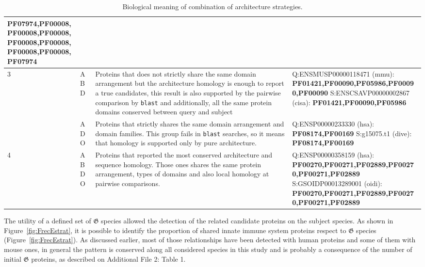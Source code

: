 \documentclass[11pt]{article}
\begin{document}
\begin{table}
\begin{center}
\begin{tabular}{p{1cm}p{1.2cm}p{9cm}p{10cm}}
{PF07974,PF00008,PF00008,PF00008,PF00008,PF00008,PF00008,PF00008,PF07974} \\
\midrule
3 & ABD & Proteins that does not strictly share the same domain arrangement
but the architecture homology is enough to report a true candidates, this 
result is also supported by the pairwise comparison by \texttt{blast} and 
additionally, all the same protein domains conserved between query and subject & 
Q:ENSMUSP00000118471 (mmu): \textbf{PF01421,PF00090,PF05986,PF00090,PF00090}
S:ENSCSAVP00000002867 (cisa): \textbf{PF01421,PF00090,PF05986}\\
& ADO & Proteins that strictly shares the same domain arrangement
and domain families. This group fails in \texttt{blast} searches, so
it means that homology is supported only by pure architecture. & 
Q:ENSP00000233330 (hsa): \textbf{PF08174,PF00169}
S:g15075.t1 (dive): \textbf{PF08174,PF00169}\\ 
\midrule
4 & ABDO & Proteins that reported the most conserved architecture
and sequence homology. Those ones shares the same protein arrangement, 
types of domains and also local homology at pairwise comparisons. &
Q:ENSP00000358159 (hsa): \textbf{PF00270,PF00271,PF02889,PF00270,PF00271,PF02889}
S:GSOIDP00013289001 (oidi): \textbf{PF00270,PF00271,PF02889,PF00270,PF00271,PF02889}\\
\bottomrule
\end{tabular}
\end{center}
\caption{Biological meaning of combination of architecture strategies.}\label{table:biologicalexplanation}
\end{table}

The utility of a defined set of $\boldsymbol{\mathfrak{G}}$ species allowed the
detection of the related candidate proteins on the subject species. As shown in
Figure~\ref{fig:FrecEstrat}, it is possible to identify the proportion of shared
innate immune system proteins respect to $\boldsymbol{\mathfrak{G}}$ species
(Figure~\ref{fig:FrecEstrat}). As discussed earlier, most of those relationships
have been detected with human proteins and some of them with mouse ones, in
general the pattern is conserved along all considered species in this study and
is probably a consequence of the number of initial $\boldsymbol{\mathfrak{G}}$
proteins, as described on Additional File 2: Table 1.
\end{document}
